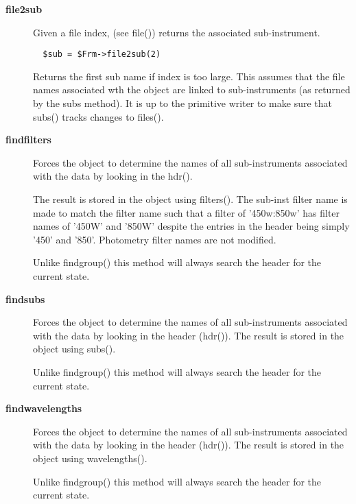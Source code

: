 \begin{description}

\item[\textbf{file2sub}] \mbox{}

Given a file index, (see file()) returns the associated
sub-instrument.

\begin{verbatim}
  $sub = $Frm->file2sub(2)
\end{verbatim}


Returns the first sub name if index is too large.
This assumes that the file names associated wth the
object are linked to sub-instruments (as returned
by the subs method). It is up to the primitive writer
to make sure that subs() tracks changes to files().


\item[\textbf{findfilters}] \mbox{}

Forces the object to determine the names of all sub-instruments
associated with the data by looking in the hdr().



The result is stored in the object using filters(). The sub-inst filter
name is made to match the filter name such that a filter of '450w:850w'
has filter names of '450W' and '850W' despite the entries in the header
being simply '450' and '850'. Photometry filter names are not modified.



Unlike findgroup() this method will always search the header for
the current state.


\item[\textbf{findsubs}] \mbox{}

Forces the object to determine the names of all sub-instruments
associated with the data by looking in the header (hdr()). 
The result is stored in the object using subs().



Unlike findgroup() this method will always search the header for
the current state.


\item[\textbf{findwavelengths}] \mbox{}

Forces the object to determine the names of all sub-instruments
associated with the data by looking in the header (hdr()). 
The result is stored in the object using wavelengths().



Unlike findgroup() this method will always search the header for
the current state.



\end{description}
